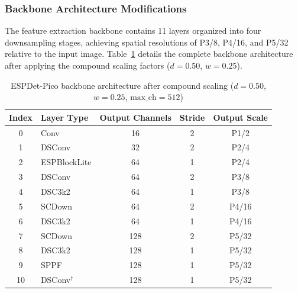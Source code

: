 \subsubsection{Backbone Architecture Modifications}

The feature extraction backbone contains 11 layers organized into four downsampling stages, achieving spatial resolutions of P3/8, P4/16, and P5/32 relative to the input image. Table~\ref{tab:espdet_backbone} details the complete backbone architecture after applying the compound scaling factors ($d=0.50$, $w=0.25$).

\begin{table}[htbp]
\centering
\caption{ESPDet-Pico backbone architecture after compound scaling ($d{=}0.50$, $w{=}0.25$, $\text{max\_ch}{=}512$)}
\label{tab:espdet_backbone}
\small
\begin{tabular}{clccc}
\toprule
\textbf{Index} & \textbf{Layer Type} & \textbf{Output Channels} & \textbf{Stride} & \textbf{Output Scale} \\
\midrule
0              & Conv                 & 16                        & 2               & P1/2                 \\
1              & DSConv               & 32                        & 2               & P2/4                 \\
2              & ESPBlockLite         & 64                        & 1               & P2/4                 \\
3              & DSConv               & 64                        & 2               & P3/8                 \\
4              & DSC3k2               & 64                        & 1               & P3/8                 \\
5              & SCDown               & 64                        & 2               & P4/16                \\
6              & DSC3k2               & 64                        & 1               & P4/16                \\
7              & SCDown               & 128                       & 2               & P5/32                \\
8              & DSC3k2               & 128                       & 1               & P5/32                \\
9              & SPPF                 & 128                       & 1               & P5/32                \\
10             & DSConv$^\dagger$     & 128                       & 1               & P5/32                \\
\bottomrule
\end{tabular}
\end{table}


